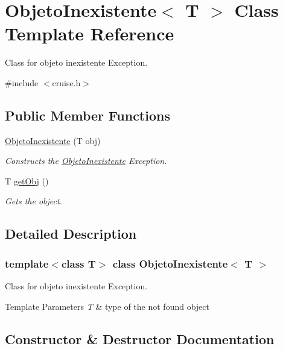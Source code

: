 \hypertarget{classObjetoInexistente}{}\section{Objeto\+Inexistente$<$ T $>$ Class Template Reference}
\label{classObjetoInexistente}


Class for objeto inexistente Exception.  




{\ttfamily \#include $<$cruise.\+h$>$}

\subsection*{Public Member Functions}
\begin{DoxyCompactItemize}
\item 
\hyperlink{classObjetoInexistente_afc2445a7ec385ce6ba4c84c8349d2ef5}{Objeto\+Inexistente} (T obj)
\begin{DoxyCompactList}\small\item\em Constructs the \hyperlink{classObjetoInexistente}{Objeto\+Inexistente} Exception. \end{DoxyCompactList}\item 
T \hyperlink{classObjetoInexistente_a2ee1f8409fad6c2995e21481ebd4736d}{get\+Obj} ()
\begin{DoxyCompactList}\small\item\em Gets the object. \end{DoxyCompactList}\end{DoxyCompactItemize}


\subsection{Detailed Description}
\subsubsection*{template$<$class T$>$\newline
class Objeto\+Inexistente$<$ T $>$}

Class for objeto inexistente Exception. 


\begin{DoxyTemplParams}{Template Parameters}
{\em T} & type of the not found object \\
\hline
\end{DoxyTemplParams}


\subsection{Constructor \& Destructor Documentation}
\mbox{\label{classObjetoInexistente_afc2445a7ec385ce6ba4c84c8349d2ef5}} 
